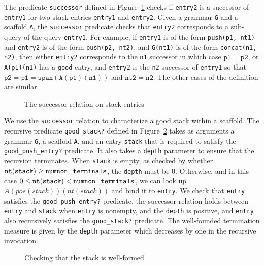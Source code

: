 \documentclass[sigplan,10pt,anonymous,review]{acmart}\settopmatter{printfolios=true,printccs=false,printacmref=false}
\begin{document}
\begin{CCSXML}
The predicate \texttt{successor} defined in Figure~\ref{pvs:successor}
checks if \texttt{entry2} is a successor of \texttt{entry1} for two stack entries \texttt{entry1} and \texttt{entry2}\@.
Given a grammar \texttt{G} and a scaffold \texttt{A}, the \texttt{successor} predicate checks that \texttt{entry2} corresponds to a sub-query of the query \texttt{entry1}\@.  For example, if \texttt{entry1} is of the form \texttt{push(p1, nt1)}
and \texttt{entry2} is of the form \texttt{push(p2, nt2)}, and \texttt{G(nt1)}
is of the form \texttt{concat(n1, n2)}, then either \texttt{entry2} corresponds to the \texttt{n1} successor in which case $\mathtt{p1} = \mathtt{p2}$, or \texttt{A(p1)(n1)} has a \texttt{good} entry, and \texttt{entry2} is the \texttt{n2} successor of \texttt{entry1} so that $\mathtt{p2} = \mathtt{p1 = span(A(p1)(n1))}$ and $\mathtt{nt2} = \mathtt{n2}$\@.  The other cases of the definition are similar.  
\begin{figure}[h!]
  
    \vspace*{-4mm}
			\caption{\small The successor relation on stack entries}
			\label{pvs:successor}
\end{figure}

We use the \texttt{successor} relation to characterize a good stack within
a scaffold.  The recursive predicate \texttt{good\_stack?} defined in Figure~\ref{pvs:goodstack} takes as arguments a grammar \texttt{G}, a scaffold \texttt{A}, and an entry \texttt{stack} that is required to
satisfy the \texttt{good\_push\_entry?} predicate.  It also takes a \texttt{depth}
parameter to ensure that the recursion terminates.  When \texttt{stack} is empty,
as checked by whether $\mathtt{nt(stack)} \geq \mathtt{num\-non\_terminals}$,
the \texttt{depth} must be $0$.  Otherwise, and in this case
$0\leq \mathtt{nt(stack)} < \mathtt{num\-non\_terminals}$, we can look up
$A(pos(stack))(nt(stack))$ and bind it to \texttt{entry}\@.  We check that
\texttt{entry} satisfies the \texttt{good\_push\_entry?} predicate,
the successor relation holds between \texttt{entry} and \texttt{stack}
when \texttt{entry} is nonempty, and the \texttt{depth} is positive, and
\texttt{entry} also recursively satisfies the \texttt{good\_stack?} predicate.
The well-founded termination measure is given by the \texttt{depth} parameter
which decreases by one in the recursive invocation.  
\begin{figure}[h!]
  
    \vspace*{-4mm}
			\caption{\small Checking that the stack is well-formed}
			\label{pvs:goodstack}
\end{figure}


\end{CCSXML}
\end{document}
